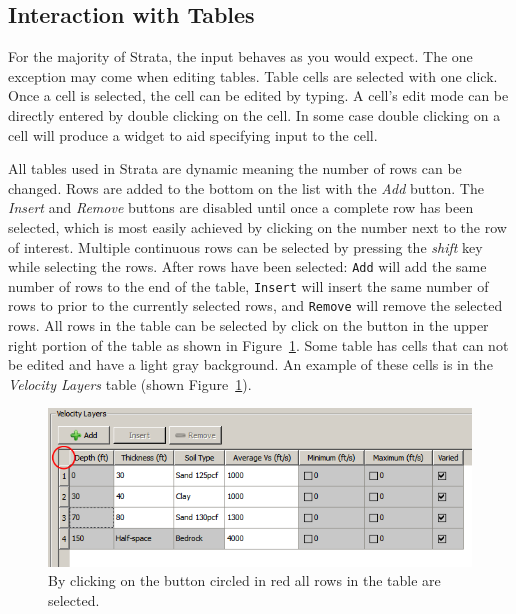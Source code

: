 \documentclass[11pt]{report}
\begin{document}
\subsection{Interaction with Tables}
For the majority of Strata, the input behaves as you would expect.  The one exception may come when
editing tables. Table cells are selected with one click.  Once a cell is selected, the cell can be
edited by typing.  A cell's edit mode can be directly entered by double clicking on the cell.  In
some case double clicking on a cell will produce a widget to aid specifying input to the cell.

All tables used in Strata are dynamic meaning the number of rows can be changed. Rows are added to
the bottom on the list with the \emph{Add} button.  The \emph{Insert} and \emph{Remove} buttons are
disabled until once a complete row has been selected, which is most easily achieved by clicking on
the number next to the row of interest.  Multiple continuous rows can be selected by pressing the
\emph{shift} key while selecting the rows.  After rows have been selected: \texttt{Add} will add the
same number of rows to the end of the table, \texttt{Insert} will insert the same number of rows to
prior to the currently selected rows, and \texttt{Remove} will remove the selected rows.  All rows
in the table can be selected by click on the button in the upper right portion of the table as shown
in Figure~\ref{fig:strata:allRowsButton}. Some table has cells that can not be edited and have a
light gray background.  An example of these cells is in the \emph{Velocity Layers} table (shown
Figure~\ref{fig:strata:allRowsButton}).

\begin{figure}
  \begin{center}
	\includegraphics[scale=0.65]{figures/strata/allRowsButton.png}
  \end{center}
  \caption{By clicking on the button circled in red all rows in the table are selected.}
  \label{fig:strata:allRowsButton}
\end{figure}
\end{document}
